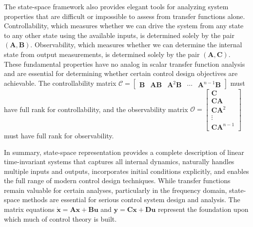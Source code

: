 The state-space framework also provides elegant tools for analyzing system properties that are difficult or impossible to assess from transfer functions alone. Controllability, which measures whether we can drive the system from any state to any other state using the available inputs, is determined solely by the pair $(\mathbf{A}, \mathbf{B})$. Observability, which measures whether we can determine the internal state from output measurements, is determined solely by the pair $(\mathbf{A}, \mathbf{C})$. These fundamental properties have no analog in scalar transfer function analysis and are essential for determining whether certain control design objectives are achievable. The controllability matrix $\mathcal{C} = \begin{bmatrix} \mathbf{B} & \mathbf{A}\mathbf{B} & \mathbf{A}^2\mathbf{B} & \cdots & \mathbf{A}^{n-1}\mathbf{B} \end{bmatrix}$ must have full rank for controllability, and the observability matrix $\mathcal{O} = \begin{bmatrix} \mathbf{C} \\ \mathbf{C}\mathbf{A} \\ \mathbf{C}\mathbf{A}^2 \\ \vdots \\ \mathbf{C}\mathbf{A}^{n-1} \end{bmatrix}$ must have full rank for observability.

In summary, state-space representation provides a complete description of linear time-invariant systems that captures all internal dynamics, naturally handles multiple inputs and outputs, incorporates initial conditions explicitly, and enables the full range of modern control design techniques. While transfer functions remain valuable for certain analyses, particularly in the frequency domain, state-space methods are essential for serious control system design and analysis. The matrix equations $\dot{\mathbf{x}} = \mathbf{A}\mathbf{x} + \mathbf{B}\mathbf{u}$ and $\mathbf{y} = \mathbf{C}\mathbf{x} + \mathbf{D}\mathbf{u}$ represent the foundation upon which much of control theory is built.
